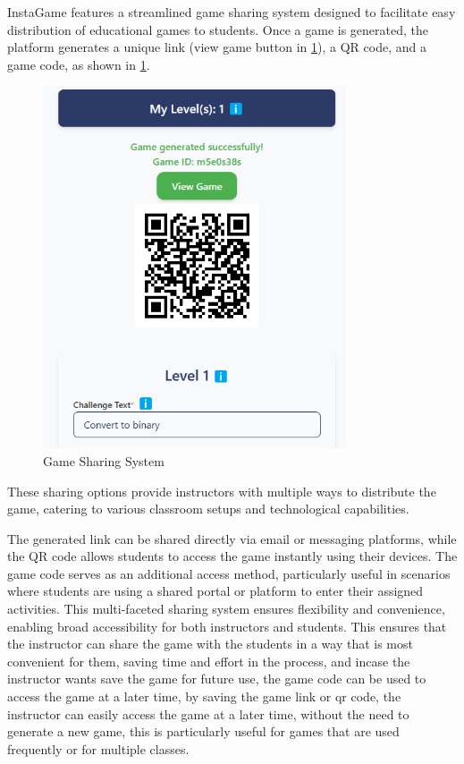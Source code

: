 InstaGame features a streamlined game sharing system designed to facilitate easy distribution of educational games to students. Once a game is generated, the platform generates a unique link (view game button in \ref{fig:shareGame}), a QR code, and a game code, as shown in \ref{fig:shareGame}. 
\begin{figure}
	\centering
	\includegraphics[width=0.8\textwidth]{figures/Space_Invaders/Instructor_Portal_Space_Invader_Generated_Links.jpeg}
	\caption{Game Sharing System}
	\label{fig:shareGame}
\end{figure}
These sharing options provide instructors with multiple ways to distribute the game, catering to various classroom setups and technological capabilities.

The generated link can be shared directly via email or messaging platforms, while the QR code allows students to access the game instantly using their devices. The game code serves as an additional access method, particularly useful in scenarios where students are using a shared portal or platform to enter their assigned activities. This multi-faceted sharing system ensures flexibility and convenience, enabling broad accessibility for both instructors and students. This ensures that the instructor can share the game with the students in a way that is most convenient for them, saving time and effort in the process, and incase the instructor wants save the game for future use, the game code can be used to access the game at a later time, by saving the game link or qr code, the instructor can easily access the game at a later time, without the need to generate a new game, this is particularly useful for games that are used frequently or for multiple classes.


